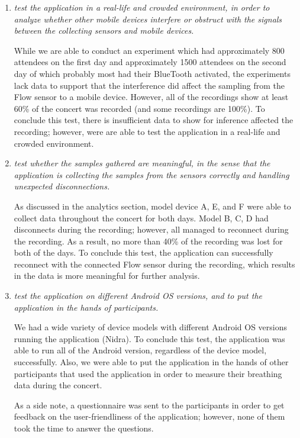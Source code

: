 \begin{enumerate}
    \item \textit{test the application in a real-life and crowded environment, in order to analyze whether other mobile devices interfere or obstruct with the signals between the collecting sensors and mobile devices.}
    
    While we are able to conduct an experiment which had approximately 800 attendees on the first day and approximately 1500 attendees on the second day of which probably most had their BlueTooth activated, the experiments lack data to support that the interference did affect the sampling from the Flow sensor to a mobile device. However, all of the recordings show at least 60\% of the concert was recorded (and some recordings are 100\%). To conclude this test, there is insufficient data to show for inference affected the recording; however, were are able to test the application in a real-life and crowded environment. 

    \item \textit{test whether the samples gathered are meaningful, in the sense that the application is collecting the samples from the sensors correctly and handling unexpected disconnections.}
    
    As discussed in the analytics section, model device A, E, and F were able to collect data throughout the concert for both days. Model B, C, D had disconnects during the recording; however, all managed to reconnect during the recording. As a result, no more than 40\% of the recording was lost for both of the days. To conclude this test, the application can successfully reconnect with the connected Flow sensor during the recording, which results in the data is more meaningful for further analysis. 

    \item \textit{test the application on different Android OS versions, and to put the application in the hands of participants.} 
    
    We had a wide variety of device models with different Android OS versions running the application (Nidra). To conclude this test, the application was able to run all of the Android version, regardless of the device model, successfully. Also, we were able to put the application in the hands of other participants that used the application in order to measure their breathing data during the concert.

    As a side note, a questionnaire was sent to the participants in order to get feedback on the user-friendliness of the application; however, none of them took the time to answer the questions.


\end{enumerate}


